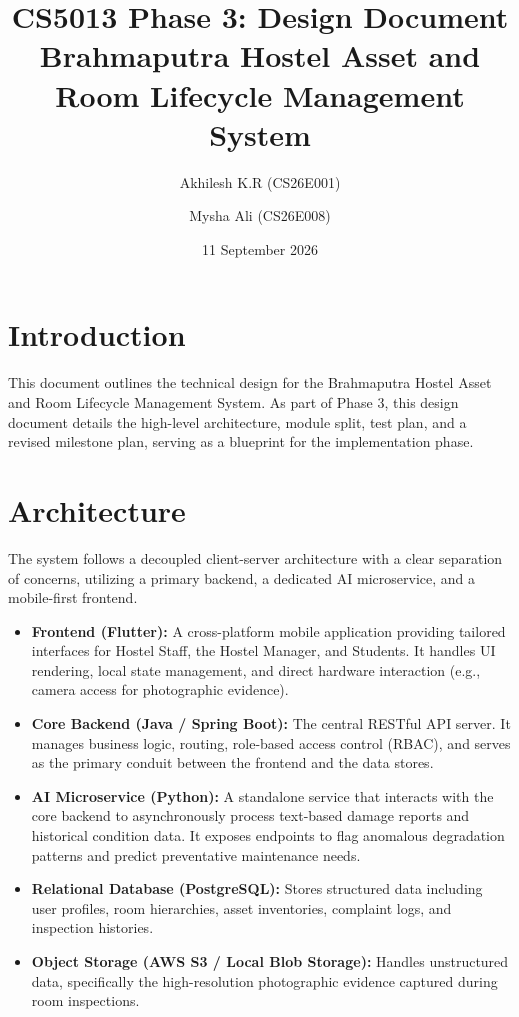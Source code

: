 \documentclass[11pt,a4paper]{article}
\title{CS5013 Phase 3: Design Document \\ Brahmaputra Hostel Asset and Room Lifecycle Management System}
\author{Akhilesh K.R (CS26E001) \and Mysha Ali (CS26E008)}
\date{11 September 2026}
\begin{document}
\maketitle

\section{Introduction}
This document outlines the technical design for the Brahmaputra Hostel Asset and Room Lifecycle Management System. As part of Phase 3, this design document details the high-level architecture, module split, test plan, and a revised milestone plan, serving as a blueprint for the implementation phase.

\section{Architecture}
The system follows a decoupled client-server architecture with a clear separation of concerns, utilizing a primary backend, a dedicated AI microservice, and a mobile-first frontend.

\begin{itemize}[noitemsep]
    \item \textbf{Frontend (Flutter):} A cross-platform mobile application providing tailored interfaces for Hostel Staff, the Hostel Manager, and Students. It handles UI rendering, local state management, and direct hardware interaction (e.g., camera access for photographic evidence).
    \item \textbf{Core Backend (Java / Spring Boot):} The central RESTful API server. It manages business logic, routing, role-based access control (RBAC), and serves as the primary conduit between the frontend and the data stores.
    \item \textbf{AI Microservice (Python):} A standalone service that interacts with the core backend to asynchronously process text-based damage reports and historical condition data. It exposes endpoints to flag anomalous degradation patterns and predict preventative maintenance needs.
    \item \textbf{Relational Database (PostgreSQL):} Stores structured data including user profiles, room hierarchies, asset inventories, complaint logs, and inspection histories.
    \item \textbf{Object Storage (AWS S3 / Local Blob Storage):} Handles unstructured data, specifically the high-resolution photographic evidence captured during room inspections.
\end{itemize}
\end{document}
